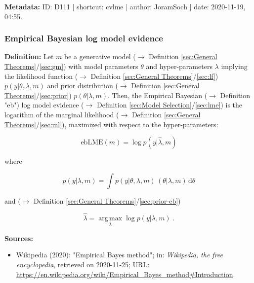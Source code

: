 \documentclass[a4paper,12pt,twoside]{book}
\begin{document}
\vspace{1em}
\textbf{Metadata:} ID: D111 | shortcut: cvlme | author: JoramSoch | date: 2020-11-19, 04:55.
\vspace{1em}



\subsubsection[\textit{Empirical Bayesian log model evidence}]{Empirical Bayesian log model evidence} \label{sec:eblme}
\setcounter{equation}{0}

\textbf{Definition:} Let $m$ be a generative model ($\rightarrow$ Definition \ref{sec:General Theorems}/\ref{sec:gm}) with model parameters $\theta$ and hyper-parameters $\lambda$ implying the likelihood function ($\rightarrow$ Definition \ref{sec:General Theorems}/\ref{sec:lf}) $p(y \vert \theta, \lambda, m)$ and prior distribution ($\rightarrow$ Definition \ref{sec:General Theorems}/\ref{sec:prior}) $p(\theta \vert \lambda, m)$. Then, the Empirical Bayesian ($\rightarrow$ Definition "eb") log model evidence ($\rightarrow$ Definition \ref{sec:Model Selection}/\ref{sec:lme}) is the logarithm of the marginal likelihood ($\rightarrow$ Definition \ref{sec:General Theorems}/\ref{sec:ml}), maximized with respect to the hyper-parameters:

\begin{equation} \label{eq:eblme-ebLME}
\mathrm{ebLME}(m) = \log p(y \vert \hat{\lambda}, m)
\end{equation}

where

\begin{equation} \label{eq:eblme-ML}
p(y \vert \lambda, m) = \int p(y \vert \theta, \lambda, m) \, (\theta \vert \lambda, m) \, \mathrm{d}\theta
\end{equation}

and ($\rightarrow$ Definition \ref{sec:General Theorems}/\ref{sec:prior-eb})

\begin{equation} \label{eq:eblme-EB}
\hat{\lambda} = \operatorname*{arg\,max}_{\lambda} \log p(y \vert \lambda, m) \; .
\end{equation}


\vspace{1em}
\textbf{Sources:}
\begin{itemize}
\item Wikipedia (2020): "Empirical Bayes method"; in: \textit{Wikipedia, the free encyclopedia}, retrieved on 2020-11-25; URL: \url{https://en.wikipedia.org/wiki/Empirical_Bayes_method#Introduction}.
\end{itemize}
\end{document}

